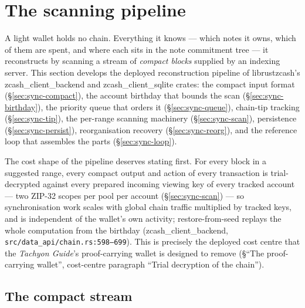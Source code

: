 \documentclass[11pt,a4paper]{article}
\theoremstyle{definition}
\begin{document}
\FloatBarrier

\section{The scanning pipeline}\label{sec:sync-scanning}

A light wallet holds no chain. Everything it knows --- which notes it owns,
which of them are spent, and where each sits in the note commitment tree ---
it reconstructs by scanning a stream of \emph{compact blocks} supplied by an
indexing server. This section develops the deployed reconstruction pipeline
of \textsf{librustzcash}'s \textsf{zcash\_client\_backend} and
\textsf{zcash\_client\_sqlite} crates: the compact input format
(\S\ref{sec:sync-compact}), the account birthday that bounds the scan
(\S\ref{sec:sync-birthday}), the priority queue that orders it
(\S\ref{sec:sync-queue}), chain-tip tracking (\S\ref{sec:sync-tip}), the
per-range scanning machinery (\S\ref{sec:sync-scan}), persistence
(\S\ref{sec:sync-persist}), reorganisation recovery
(\S\ref{sec:sync-reorg}), and the reference loop that assembles the parts
(\S\ref{sec:sync-loop}).

The cost shape of the pipeline deserves stating first. For every block in a
suggested range, every compact output and action of every transaction is
trial-decrypted against every prepared incoming viewing key of every tracked
account --- two ZIP-32 scopes per pool per account
(\S\ref{sec:sync-scan}) --- so synchronisation work scales with global chain
traffic multiplied by tracked keys, and is independent of the wallet's own
activity; restore-from-seed replays the whole computation from the birthday
(\textsf{zcash\_client\_backend}, \texttt{src/data\_api/chain.rs:598--699}).
This is
precisely the deployed cost centre that the \emph{Tachyon Guide}'s
proof-carrying wallet is designed to remove (\S``The proof-carrying
wallet'', cost-centre paragraph ``Trial decryption of the chain'').

\subsection{The compact stream}\label{sec:sync-scan-stream}
\end{document}
